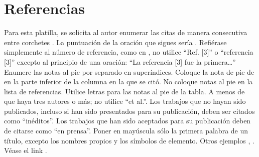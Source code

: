 \section*{Referencias}

Para esta platilla, se solicita al autor enumerar las citas de manera consecutiva entre corchetes \cite{YLi2013}. 
La puntuación de la oración que sigues sería \cite{Mesaelides2011}. 
Refiérase simplemente al número de referencia, como en \cite{Morales2012}, no utilice “Ref. [3]” o “referencia [3]” excepto al principio de una oración: “La referencia [3] fue la primera…”
Enumere las notas al pie por separado en superíndices. Coloque la nota de pie de en la parte inferior de la columna en la que se citó. No coloque notas al pie en la lista de referencias. Utilice letras para las notas al pie de la tabla.
A menos de que haya tres autores o más; no utilice “et al.”. Los trabajos que no hayan sido publicados, incluso si han sido presentados para su publicación, deben ser citados como “inéditos”. Los trabajos que han sido aceptados para su publicación deben de citarse como “en prensa”. Poner en mayúscula sólo la primera palabra de un título, excepto los nombres propios y los símbolos de elemento. 
Otros ejemplos \cite{LAAngeles2021}, \cite{LAAngelesConni}. 
Véase el link \cite{prueba}.





